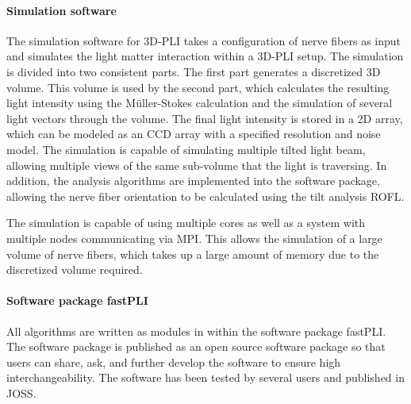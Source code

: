 \paragraph{Simulation software}
% 
The simulation software for \ac{3D-PLI} takes a configuration of nerve fibers as input and simulates the light matter interaction within a \ac{3D-PLI} setup.
The simulation is divided into two consistent parts.
The first part generates a discretized 3D volume.
This volume is used by the second part, which calculates the resulting light intensity using the M{\"u}ller-Stokes calculation and the simulation of several light vectors through the volume.
The final light intensity is stored in a 2D array, which can be modeled as an \ac{CCD} array with a specified resolution and noise model.
The simulation is capable of simulating multiple tilted light beam, allowing multiple views of the same sub-volume that the light is traversing.
In addition, the analysis algorithms are implemented into the software package, allowing the nerve fiber orientation to be calculated using the tilt analysis \ac{ROFL}.
\par
% 
The simulation is capable of using multiple cores as well as a system with multiple nodes communicating via \ac{MPI}.
This allows the simulation of a large volume of nerve fibers, which takes up a large amount of memory due to the discretized volume required.
% 
% 
% 
\paragraph{Software package \acs{fastPLI}}
% 
All algorithms are written as modules in \python{} within the software package \ac{fastPLI}.
The software package is published as an open source software package so that users can share, ask, and further develop the software to ensure high interchangeability. 
The software has been tested by several users and published in \ac{JOSS}.
% 
% 
% 

